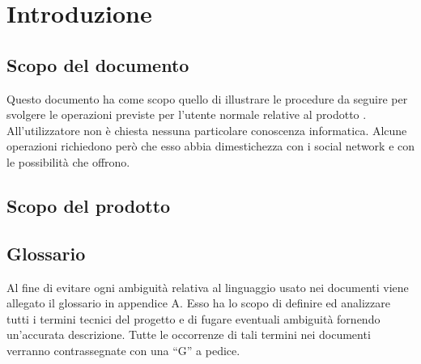 %


\section{Introduzione} %
\label{sec:introduzione}


	\subsection{Scopo del documento} %
	\label{sub:scopo_del_documento}
		Questo documento ha come scopo quello di illustrare le procedure da seguire per svolgere le operazioni previste per l'utente normale relative al prodotto \projectName. All'utilizzatore non è chiesta nessuna particolare conoscenza informatica. Alcune operazioni richiedono però che esso abbia dimestichezza con i social network e con le possibilità che offrono.


	\subsection{Scopo del prodotto} %
	\label{sub:scopo_del_prodotto}
		\productScope


	\subsection{Glossario} %
	\label{sub:glossario}
		Al fine di evitare ogni ambiguità relativa al linguaggio usato nei documenti viene allegato il glossario in appendice A.\newline
		Esso ha lo scopo di definire ed analizzare tutti i termini tecnici del progetto e di fugare eventuali ambiguità fornendo un'accurata descrizione.\newline
		Tutte le occorrenze di tali termini nei documenti verranno contrassegnate con una ``G'' a pedice.

